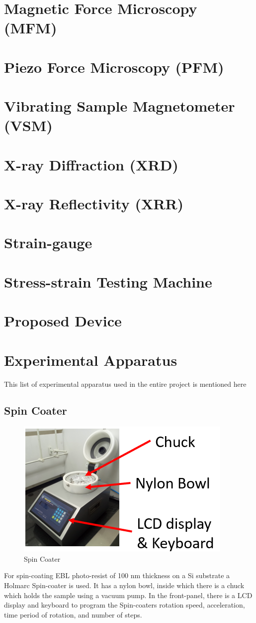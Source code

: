 \section{Magnetic Force Microscopy (MFM)}
\section{Piezo Force Microscopy (PFM)}
\section{Vibrating Sample Magnetometer (VSM)}
\section{X-ray Diffraction (XRD)}
\section{X-ray Reflectivity (XRR)}
\section{Strain-gauge}
\section{Stress-strain Testing Machine}
\section{Proposed Device}

\section{Experimental Apparatus}
This list of experimental apparatus used in the entire project is mentioned here
\subsection{Spin Coater}
\begin{figure}[H]
	\centering
   \includegraphics[scale=0.56]{Images/4.png} 
   \caption{Spin Coater}
\end{figure}
For spin-coating EBL photo-resist of 100 nm thickness on a Si substrate a Holmarc Spin-coater is used. It has a nylon bowl, inside which there is a chuck which holds the sample using a vacuum pump. In the front-panel, there is a LCD display and keyboard to program the Spin-coaters rotation speed, acceleration, time period of rotation, and number of steps.  

